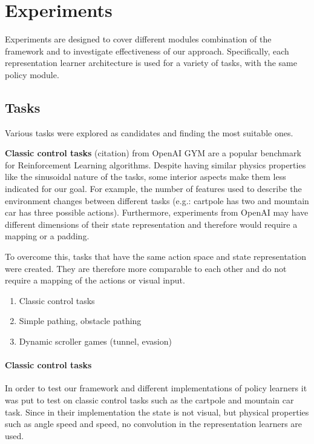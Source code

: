 \section{Experiments}
\label{sec:experiments}

Experiments are designed to cover different modules combination of the framework and to investigate effectiveness of our approach. Specifically, each representation learner architecture is used for a variety of tasks, with the same policy module. 

\subsection{Tasks}
\label{sec:tasks}
Various tasks were explored as candidates and finding the most suitable ones.

\textbf{Classic control tasks} (citation) from OpenAI GYM are a popular benchmark for Reinforcement Learning algorithms. Despite having similar physics properties like the sinusoidal nature of the tasks, some interior aspects make them less indicated for our goal. For example, the number of features used to describe the environment changes between different tasks (e.g.: cartpole has two and mountain car has three possible actions). Furthermore, experiments from OpenAI may have different dimensions of their state representation and therefore would require a mapping or a padding.

To overcome this, tasks that have the same action space and state representation were created. They are therefore more comparable to each other and do not require a mapping of the actions or visual input. 
  \begin{enumerate}
	\item Classic control tasks
	\item Simple pathing, obstacle pathing
	\item Dynamic scroller games (tunnel, evasion)
\end{enumerate}

\paragraph{Classic control tasks}
In order to test our framework and different implementations of policy learners it was put to test on classic control tasks such as the cartpole and mountain car task. Since in their implementation the state is not visual, but physical properties such as angle speed and speed, no convolution in the representation learners are used. 

